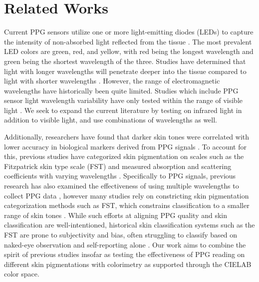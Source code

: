 \documentclass[letterpaper, 10 pt, conference]{ieeeconf}  %
\begin{document}
\section{Related Works}
Current PPG sensors utilize one or more light-emitting diodes (LEDs) to capture the intensity of non-absorbed light reflected from the tissue \cite{castaneda_review_2018}. The most prevalent LED colors are green, red, and yellow, with red being the longest wavelength and green being the shortest wavelength of the three. Studies have determined that light with longer wavelengths will penetrate deeper into the tissue compared to light with shorter wavelengths \cite{fallow_influence_2013}\cite{setchfield_effect_2024}. However, the range of electromagnetic wavelengths have historically been quite limited. Studies which include PPG sensor light wavelength variability have only tested within the range of visible light \cite{al-halawani_review_2023}\cite{fallow_influence_2013}. We seek to expand the current literature by testing on infrared light in addition to visible light, and use combinations of wavelengths as well.

Additionally, researchers have found that darker skin tones were correlated with lower accuracy in biological markers derived from PPG signals \cite{al-halawani_review_2023}\cite{bent_investigating_2020}. To account for this, previous studies have categorized skin pigmentation on scales such as the Fitzpatrick skin type scale (FST) and measured absorption and scattering coefficients with varying wavelengths \cite{setchfield_effect_2024}. Specifically to PPG signals, previous research has also examined the effectiveness of using multiple wavelengths to collect PPG data \cite{ray_review_2023}, however many studies rely on constricting skin pigmentation categorization methods such as FST, which constrains classification to a smaller range of skin tones \cite{okoji_equity_2021}. While such efforts at aligning PPG quality and skin classification are well-intentioned, historical skin classification systems such as the FST are prone to subjectivity and bias, often struggling to classify based on naked-eye observation and self-reporting alone \cite{fitzpatrick_validity_1988}. Our work aims to combine the spirit of previous studies insofar as testing the effectiveness of PPG reading on different skin pigmentations with colorimetry as supported through the CIELAB color space. 

\end{document}
